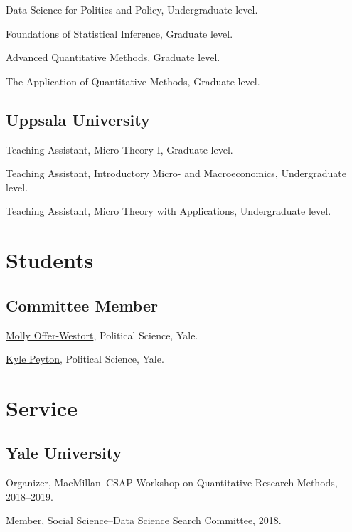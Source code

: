 \documentclass[10pt,letterpaper]{article}
\newenvironment{datelist}{
	\begin{list}{}{
		\setlength{\parskip}{0pt}
		\setlength{\itemsep}{4pt}
		\setlength{\parsep}{0.3em}
		\setlength{\leftmargin}{6em}
		\setlength{\labelwidth}{6em}
		\setlength{\labelsep}{1.5em}
		}
	}{
\end{list}
}
\newenvironment{singledatelist}{
	\begin{list}{}{
		\setlength{\parskip}{0pt}
		\setlength{\itemsep}{4pt}
		\setlength{\parsep}{0.3em}
		\setlength{\leftmargin}{5em}
		\setlength{\labelwidth}{6em}
		\setlength{\labelsep}{1.5em}
		}
	}{
\end{list}
}
\newcommand{\dateitem}[2][]{\item[{#1}] {#2}}
\newenvironment{infolist}{
	\begin{list}{}{
		\setlength{\parskip}{0pt}
		\setlength{\itemsep}{4pt}
		\setlength{\parsep}{0.3em}
		\setlength{\leftmargin}{1.6em}
		\setlength{\labelwidth}{0pt}
		}
	}{
\end{list}
}
\newcommand{\infoitem}[1]{\item {#1}}
\begin{document}
	\begin{datelist}
		\dateitem[2018--2019]{Data Science for Politics and Policy, Undergraduate level.}
		\dateitem[2019]{Foundations of Statistical Inference, Graduate level.}
		\dateitem[2017--2018]{Advanced Quantitative Methods, Graduate level.}
		\dateitem[2018]{The Application of Quantitative Methods, Graduate level.}
	\end{datelist}

	\subsection*{Uppsala University}

	\begin{datelist}
		\dateitem[2011--2012]{Teaching Assistant, Micro Theory I, Graduate level.}
		\dateitem[2011--2012]{Teaching Assistant, Introductory Micro- and Macroeconomics, Undergraduate level.}
		\dateitem[2011]{Teaching Assistant, Micro Theory with Applications, Undergraduate level.}
	\end{datelist}


	\section*{Students}

	\subsection*{Committee Member}

	\begin{singledatelist}
		\dateitem[Current]{\href{https://mollyow.github.io}{Molly Offer-Westort}, Political Science, Yale.}
		\dateitem[Current]{\href{https://kylepeyton.github.io}{Kyle Peyton}, Political Science, Yale.}
	\end{singledatelist}


	\section*{Service}

	\subsection*{Yale University}

	\begin{infolist}
		\infoitem{Organizer, MacMillan--CSAP Workshop on Quantitative Research Methods, 2018--2019.}
		\infoitem{Member, Social Science--Data Science Search Committee, 2018.}
	\end{infolist}
\end{document}
